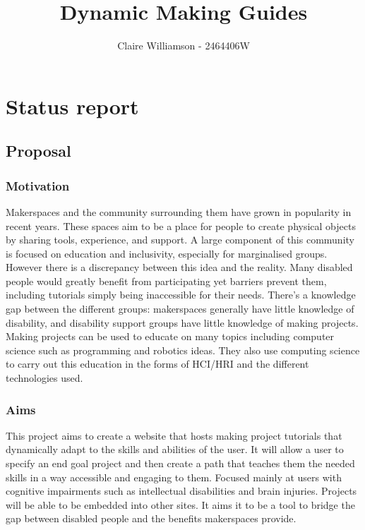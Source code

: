 \documentclass[11pt]{article}
\title{ Dynamic Making Guides }
\author{ Claire Williamson - 2464406W }
\begin{document}
\maketitle




\section{Status report}

\subsection{Proposal}\label{proposal}

\subsubsection{Motivation}\label{motivation}

Makerspaces and the community surrounding them have grown in popularity in recent years. These spaces aim to be a place for people to create physical objects by sharing tools, experience, and support. A large component of this community is focused on education and inclusivity, especially for marginalised groups. However there is a discrepancy between this idea and the reality. Many disabled people would greatly benefit from participating yet barriers prevent them, including tutorials simply being inaccessible for their needs. There's a knowledge gap between the different groups: makerspaces generally have little knowledge of disability, and disability support groups have little knowledge of making projects. Making projects can be used to educate on many topics including computer science such as programming and robotics ideas. They also use computing science to carry out this education in the forms of HCI/HRI and the different technologies used. 


\subsubsection{Aims}\label{aims}

This project aims to create a website that hosts making project tutorials that dynamically adapt to the skills and abilities of the user. It will allow a user to specify an end goal project and then create a path that teaches them the needed skills in a way accessible and engaging to them. Focused mainly at users with cognitive impairments such as intellectual disabilities and brain injuries. Projects will be able to be embedded into other sites. It aims it to be a tool to bridge the gap between disabled people and the benefits makerspaces provide. 
\end{document}
